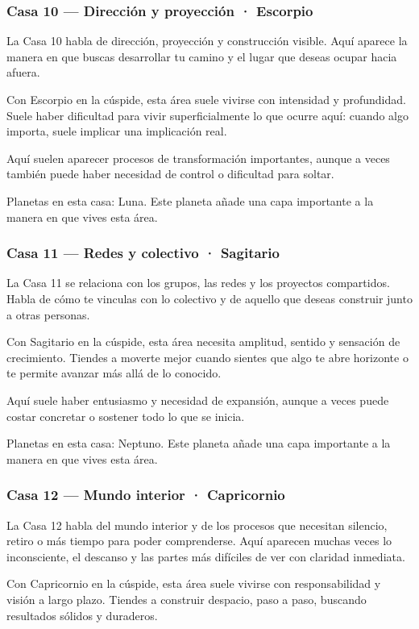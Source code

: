 \documentclass[11pt,a4paper]{article}
\begin{document}
\subsubsection*{Casa 10 — Dirección y proyección · Escorpio}
La Casa 10 habla de dirección, proyección y construcción visible. Aquí aparece la manera en que buscas desarrollar tu camino y el lugar que deseas ocupar hacia afuera.

Con Escorpio en la cúspide, esta área suele vivirse con intensidad y profundidad. Suele haber dificultad para vivir superficialmente lo que ocurre aquí: cuando algo importa, suele implicar una implicación real.

Aquí suelen aparecer procesos de transformación importantes, aunque a veces también puede haber necesidad de control o dificultad para soltar.

Planetas en esta casa: Luna. Este planeta añade una capa importante a la manera en que vives esta área.

\subsubsection*{Casa 11 — Redes y colectivo · Sagitario}
La Casa 11 se relaciona con los grupos, las redes y los proyectos compartidos. Habla de cómo te vinculas con lo colectivo y de aquello que deseas construir junto a otras personas.

Con Sagitario en la cúspide, esta área necesita amplitud, sentido y sensación de crecimiento. Tiendes a moverte mejor cuando sientes que algo te abre horizonte o te permite avanzar más allá de lo conocido.

Aquí suele haber entusiasmo y necesidad de expansión, aunque a veces puede costar concretar o sostener todo lo que se inicia.

Planetas en esta casa: Neptuno. Este planeta añade una capa importante a la manera en que vives esta área.

\subsubsection*{Casa 12 — Mundo interior · Capricornio}
La Casa 12 habla del mundo interior y de los procesos que necesitan silencio, retiro o más tiempo para poder comprenderse. Aquí aparecen muchas veces lo inconsciente, el descanso y las partes más difíciles de ver con claridad inmediata.

Con Capricornio en la cúspide, esta área suele vivirse con responsabilidad y visión a largo plazo. Tiendes a construir despacio, paso a paso, buscando resultados sólidos y duraderos.
\end{document}
